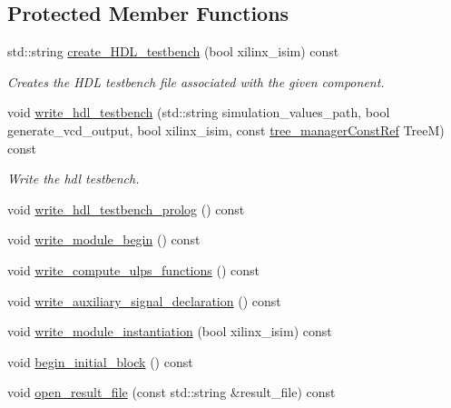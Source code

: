 \subsection*{Protected Member Functions}
\begin{DoxyCompactItemize}
\item 
std\+::string \hyperlink{classTestbenchGenerationBaseStep_a8165d4d698bb9c74fbfd781a69fbe768}{create\+\_\+\+H\+D\+L\+\_\+testbench} (bool xilinx\+\_\+isim) const
\begin{DoxyCompactList}\small\item\em Creates the H\+DL testbench file associated with the given component. \end{DoxyCompactList}\item 
void \hyperlink{classTestbenchGenerationBaseStep_af70241181e695727fd672f4e5fb490a1}{write\+\_\+hdl\+\_\+testbench} (std\+::string simulation\+\_\+values\+\_\+path, bool generate\+\_\+vcd\+\_\+output, bool xilinx\+\_\+isim, const \hyperlink{tree__manager_8hpp_a792e3f1f892d7d997a8d8a4a12e39346}{tree\+\_\+manager\+Const\+Ref} TreeM) const
\begin{DoxyCompactList}\small\item\em Write the hdl testbench. \end{DoxyCompactList}\item 
void \hyperlink{classTestbenchGenerationBaseStep_a06ab878cf08dd36fd8273fe4ffcca9d5}{write\+\_\+hdl\+\_\+testbench\+\_\+prolog} () const
\item 
void \hyperlink{classTestbenchGenerationBaseStep_abdf8e7f71d552b9d0fc929247fb1e44a}{write\+\_\+module\+\_\+begin} () const
\item 
void \hyperlink{classTestbenchGenerationBaseStep_a5b8923d72a57f276c4a739775e2ef707}{write\+\_\+compute\+\_\+ulps\+\_\+functions} () const
\item 
void \hyperlink{classTestbenchGenerationBaseStep_ae51ed1b581d6afe1f5826f767668687c}{write\+\_\+auxiliary\+\_\+signal\+\_\+declaration} () const
\item 
void \hyperlink{classTestbenchGenerationBaseStep_aaa5345d601cfdea191b4f42906095e8e}{write\+\_\+module\+\_\+instantiation} (bool xilinx\+\_\+isim) const
\item 
void \hyperlink{classTestbenchGenerationBaseStep_a0cc1e31a8699e752f6913b9f5b3d2f07}{begin\+\_\+initial\+\_\+block} () const
\item 
void \hyperlink{classTestbenchGenerationBaseStep_a4fe34404d8fb60195bcc552a79e8533a}{open\+\_\+result\+\_\+file} (const std\+::string \&result\+\_\+file) const

\end{DoxyCompactItemize}
